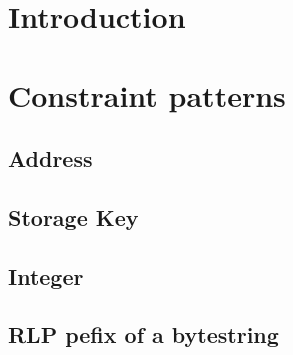 \section{Introduction}

\section{Constraint patterns}

\subsection{Address} 
\subsection{Storage Key} 
\subsection{Integer} 
\subsection{RLP pefix of a bytestring} 
